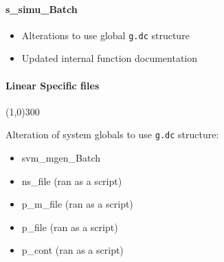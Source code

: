 \documentclass[12pt]{article}
\begin{document}
\paragraph{s\_simu\_Batch}
	\begin{itemize}
		\item Alterations to use global \verb|g.dc| structure
		\item Updated internal function documentation
	\end{itemize}


\pagebreak
\paragraph{Linear Specific files}\line(1,0){300}

Alteration of system globals to use \verb|g.dc| structure:

	\begin{itemize}
		\item svm\_mgen\_Batch
		\item ns\_file (ran as a script)
		\item p\_m\_file (ran as a script)
		\item p\_file (ran as a script)
		\item p\_cont (ran as a script)
	\end{itemize}
	
	
\end{document}
